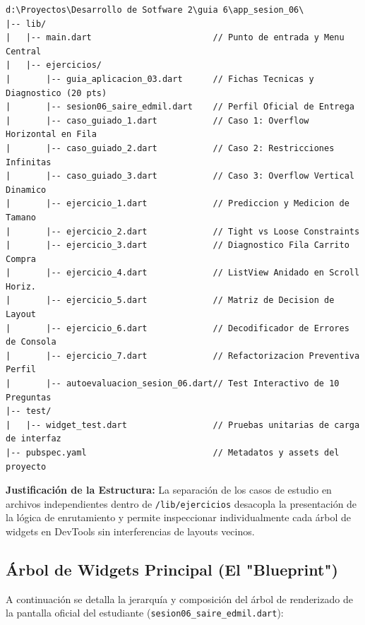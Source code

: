 \documentclass[12pt,a4paper]{article}
\begin{document}
\begin{verbatim}
d:\Proyectos\Desarrollo de Sotfware 2\guia 6\app_sesion_06\
|-- lib/
|   |-- main.dart                        // Punto de entrada y Menu Central
|   |-- ejercicios/
|       |-- guia_aplicacion_03.dart      // Fichas Tecnicas y Diagnostico (20 pts)
|       |-- sesion06_saire_edmil.dart    // Perfil Oficial de Entrega
|       |-- caso_guiado_1.dart           // Caso 1: Overflow Horizontal en Fila
|       |-- caso_guiado_2.dart           // Caso 2: Restricciones Infinitas
|       |-- caso_guiado_3.dart           // Caso 3: Overflow Vertical Dinamico
|       |-- ejercicio_1.dart             // Prediccion y Medicion de Tamano
|       |-- ejercicio_2.dart             // Tight vs Loose Constraints
|       |-- ejercicio_3.dart             // Diagnostico Fila Carrito Compra
|       |-- ejercicio_4.dart             // ListView Anidado en Scroll Horiz.
|       |-- ejercicio_5.dart             // Matriz de Decision de Layout
|       |-- ejercicio_6.dart             // Decodificador de Errores de Consola
|       |-- ejercicio_7.dart             // Refactorizacion Preventiva Perfil
|       |-- autoevaluacion_sesion_06.dart// Test Interactivo de 10 Preguntas
|-- test/
|   |-- widget_test.dart                 // Pruebas unitarias de carga de interfaz
|-- pubspec.yaml                         // Metadatos y assets del proyecto
\end{verbatim}

\textbf{Justificación de la Estructura:} La separación de los casos de estudio en archivos independientes dentro de \texttt{/lib/ejercicios} desacopla la presentación de la lógica de enrutamiento y permite inspeccionar individualmente cada árbol de widgets en DevTools sin interferencias de layouts vecinos.

\subsection{Árbol de Widgets Principal (El "Blueprint")}
A continuación se detalla la jerarquía y composición del árbol de renderizado de la pantalla oficial del estudiante (\texttt{sesion06\_saire\_edmil.dart}):
\end{document}
